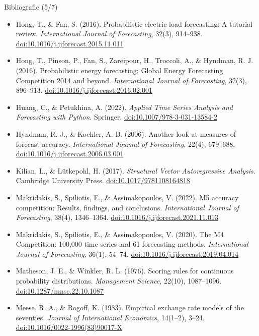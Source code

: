 \begin{frame}{Bibliografie (5/7)}
\itemsize{\tiny}
\begin{itemize}
    \item Hong, T., \& Fan, S. (2016). Probabilistic electric load forecasting: A tutorial review. \textit{International Journal of Forecasting}, 32(3), 914--938. \href{https://doi.org/10.1016/j.ijforecast.2015.11.011}{doi:10.1016/j.ijforecast.2015.11.011}
    \item Hong, T., Pinson, P., Fan, S., Zareipour, H., Troccoli, A., \& Hyndman, R. J. (2016). Probabilistic energy forecasting: Global Energy Forecasting Competition 2014 and beyond. \textit{International Journal of Forecasting}, 32(3), 896--913. \href{https://doi.org/10.1016/j.ijforecast.2016.02.001}{doi:10.1016/j.ijforecast.2016.02.001}
    \item Huang, C., \& Petukhina, A. (2022). \textit{Applied Time Series Analysis and Forecasting with Python}. Springer. \href{https://doi.org/10.1007/978-3-031-13584-2}{doi:10.1007/978-3-031-13584-2}
    \item Hyndman, R. J., \& Koehler, A. B. (2006). Another look at measures of forecast accuracy. \textit{International Journal of Forecasting}, 22(4), 679--688. \href{https://doi.org/10.1016/j.ijforecast.2006.03.001}{doi:10.1016/j.ijforecast.2006.03.001}
    \item Kilian, L., \& Lütkepohl, H. (2017). \textit{Structural Vector Autoregressive Analysis}. Cambridge University Press. \href{https://doi.org/10.1017/9781108164818}{doi:10.1017/9781108164818}
    \item Makridakis, S., Spiliotis, E., \& Assimakopoulos, V. (2022). M5 accuracy competition: Results, findings, and conclusions. \textit{International Journal of Forecasting}, 38(4), 1346--1364. \href{https://doi.org/10.1016/j.ijforecast.2021.11.013}{doi:10.1016/j.ijforecast.2021.11.013}
    \item Makridakis, S., Spiliotis, E., \& Assimakopoulos, V. (2020). The M4 Competition: 100,000 time series and 61 forecasting methods. \textit{International Journal of Forecasting}, 36(1), 54--74. \href{https://doi.org/10.1016/j.ijforecast.2019.04.014}{doi:10.1016/j.ijforecast.2019.04.014}
    \item Matheson, J. E., \& Winkler, R. L. (1976). Scoring rules for continuous probability distributions. \textit{Management Science}, 22(10), 1087--1096. \href{https://doi.org/10.1287/mnsc.22.10.1087}{doi:10.1287/mnsc.22.10.1087}
    \item Meese, R. A., \& Rogoff, K. (1983). Empirical exchange rate models of the seventies. \textit{Journal of International Economics}, 14(1--2), 3--24. \href{https://doi.org/10.1016/0022-1996(83)90017-X}{doi:10.1016/0022-1996(83)90017-X}

\end{itemize}
\end{frame}
